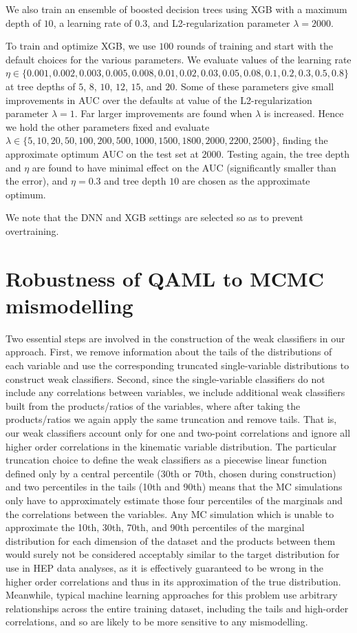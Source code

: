 \documentclass[fleqn,10pt]{wlscirep}
\begin{document}
We  also train an ensemble of boosted decision trees using XGB \cite{xgboost}
with a maximum depth of $10$, a learning rate of $0.3$, and L2-regularization parameter $\lambda=2000$. 

To train and optimize XGB, we use $100$ rounds of training and start with the default choices for the various parameters. We  evaluate values of the learning rate\\ 
\noindent $\eta\in\{0.001,0.002,0.003,0.005,0.008,0.01,0.02,0.03,0.05,0.08,0.1,0.2,0.3,0.5,0.8\}$
at tree depths of $5$, $8$, $10$, $12$, $15$, and $20$. Some of these parameters give small improvements in AUC over the defaults at value of the L2-regularization parameter $\lambda=1$. Far larger improvements are found when $\lambda$ is increased.  Hence  we hold the other parameters fixed and  evaluate $\lambda\in\{5,10,20,50,100,200,500,1000,1500,1800,2000,2200,2500\}$, finding the approximate optimum AUC on the test set at $2000$. Testing again, the tree depth and $\eta$ are  found to have minimal effect on the AUC (significantly smaller than the error), and $\eta=0.3$ and tree depth $10$ are  chosen as the approximate optimum. 

We note that the DNN and XGB settings are selected so as to prevent overtraining. 

\section*{Robustness of QAML to MCMC mismodelling}
Two essential steps are involved in the construction of the weak classifiers in our approach. First, we remove information about the tails of the distributions of each variable and use the corresponding truncated single-variable distributions to construct weak classifiers. Second, since the single-variable classifiers do not include any correlations between variables, we include additional weak classifiers built from the products/ratios of the variables, where after taking the products/ratios we again apply the same truncation and remove tails. That is, our weak classifiers account only for one and two-point correlations and ignore all higher order correlations in the kinematic variable distribution.
The particular truncation choice to define the weak classifiers as a piecewise linear function defined only by a central percentile (30th or 70th, chosen during construction) and two percentiles in the tails (10th and 90th) means that the MC simulations only have to approximately estimate those four percentiles of the marginals and the correlations between the variables. Any MC simulation which is unable to approximate the 10th, 30th, 70th, and 90th percentiles of the marginal distribution for each dimension of the dataset and the products between them would surely not be considered acceptably similar to the target distribution for use in HEP data analyses, as it is effectively guaranteed to be wrong in the higher order correlations and thus in its approximation of the true distribution. Meanwhile, typical machine learning approaches for this problem use arbitrary relationships across the entire training dataset, including the tails and high-order correlations, and so are likely to be more sensitive to any mismodelling.
\end{document}
